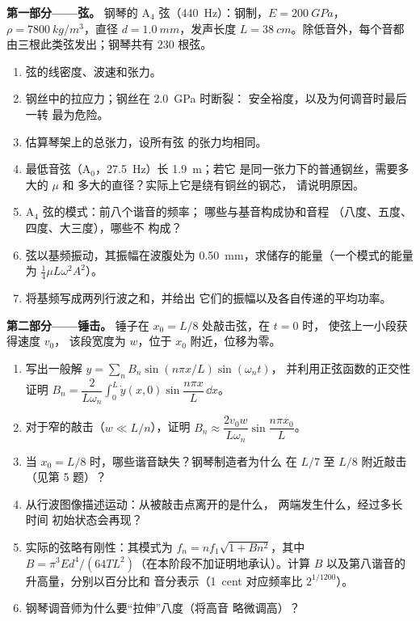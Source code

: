 \begin{problem}
\label{pb:b2:waves-on-strings:1}

\medskip
\noindent\textbf{第一部分——弦。}
钢琴的 A$_4$ 弦（\qty{440}{Hz}）：钢制，$E = \qty{200}{GPa}$，$\rho =
\qty{7800}{kg/m^3}$，直径 $d = \qty{1.0}{mm}$，发声长度 $L =
\qty{38}{cm}$。除低音外，每个音都由三根此类弦发出；钢琴共有
$230$ 根弦。
\begin{enumerate}
  \item 弦的线密度、波速和张力。
  \item 钢丝中的拉应力；钢丝在 \qty{2.0}{GPa} 时断裂：
        安全裕度，以及为何调音时最后一转
        最为危险。
  \item 估算琴架上的总张力，设所有弦
        的张力均相同。
  \item 最低音弦（A$_0$，\qty{27.5}{Hz}）长 \qty{1.9}{m}；若它
        是同一张力下的普通钢丝，需要多大的 $\mu$ 和
        多大的直径？实际上它是绕有铜丝的钢芯，
        请说明原因。
  \item A$_4$ 弦的模式：前八个谐音的频率；
        哪些与基音构成协和音程
        （八度、五度、四度、大三度），哪些不
        构成？
  \item 弦以基频振动，其振幅在波腹处为
        \qty{0.50}{mm}，求储存的能量（一个模式的能量
        为 $\tfrac14\mu L\omega^2A^2$）。
  \item 将基频写成两列行波之和，并给出
        它们的振幅以及各自传递的平均功率。
\end{enumerate}

\medskip
\noindent\textbf{第二部分——锤击。}
锤子在 $x_0 = L/8$ 处敲击弦，在 $t = 0$ 时，
使弦上一小段获得速度 $v_0$，
该段宽度为 $w$，位于 $x_0$ 附近，位移为零。
\begin{enumerate}[resume]
  \item 写出一般解 $y = \sum_nB_n\sin(n\pi x/L)\sin(\omega_nt)$，
        并利用正弦函数的正交性证明 $B_n =
        \dfrac{2}{L\omega_n}\int_0^L\dot y(x, 0)\sin\dfrac{n\pi x}L\,\dd x$。
  \item 对于窄的敲击（$w \ll L/n$），证明 $B_n \approx \dfrac{2v_0w}
        {L\omega_n}\sin\dfrac{n\pi x_0}{L}$。
  \item 当 $x_0 = L/8$ 时，哪些谐音缺失？钢琴制造者为什么
        在 $L/7$ 至 $L/8$ 附近敲击（见第 5 题）？
  \item 从行波图像描述运动：从被敲击点离开的是什么，
        两端发生什么，经过多长时间
        初始状态会再现？
  \item 实际的弦略有刚性：其模式为 $f_n = nf_1
        \sqrt{1 + Bn^2}$，其中 $B = \pi^3Ed^4/(64TL^2)$（在本阶段不加证明地承认）。计算
        $B$ 以及第八谐音的升高量，分别以百分比和
        音分表示（\qty{1}{cent} 对应频率比 $2^{1/1200}$）。
  \item 钢琴调音师为什么要“拉伸”八度（将高音
        略微调高）？
\end{enumerate}


\end{problem}
